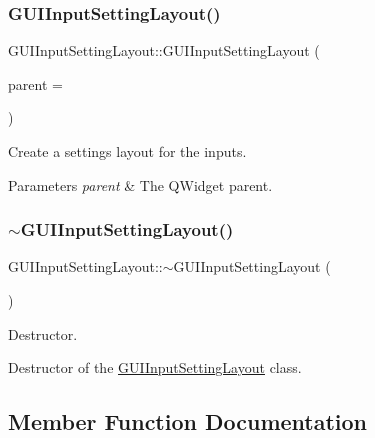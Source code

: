 \subsubsection{\texorpdfstring{G\+U\+I\+Input\+Setting\+Layout()}{GUIInputSettingLayout()}}
{\footnotesize\ttfamily G\+U\+I\+Input\+Setting\+Layout\+::\+G\+U\+I\+Input\+Setting\+Layout (\begin{DoxyParamCaption}\item[{Q\+Widget $\ast$}]{parent = {} }\end{DoxyParamCaption})}



Create a settings layout for the inputs. 


\begin{DoxyParams}{Parameters}
{\em parent} & The Q\+Widget parent. \\
\hline
\end{DoxyParams}
\mbox{\label{class_g_u_i_input_setting_layout_a266755dd96c70a4059966d5a419c891b}} 
\subsubsection{\texorpdfstring{$\sim$\+G\+U\+I\+Input\+Setting\+Layout()}{~GUIInputSettingLayout()}}
{\footnotesize\ttfamily G\+U\+I\+Input\+Setting\+Layout\+::$\sim$\+G\+U\+I\+Input\+Setting\+Layout (\begin{DoxyParamCaption}{ }\end{DoxyParamCaption})}



Destructor. 

Destructor of the \mbox{\hyperlink{class_g_u_i_input_setting_layout}{G\+U\+I\+Input\+Setting\+Layout}} class. 

\subsection{Member Function Documentation}
\mbox{\label{class_g_u_i_input_setting_layout_ac1bb93144f1301a145ce4497bafa1791}} 
